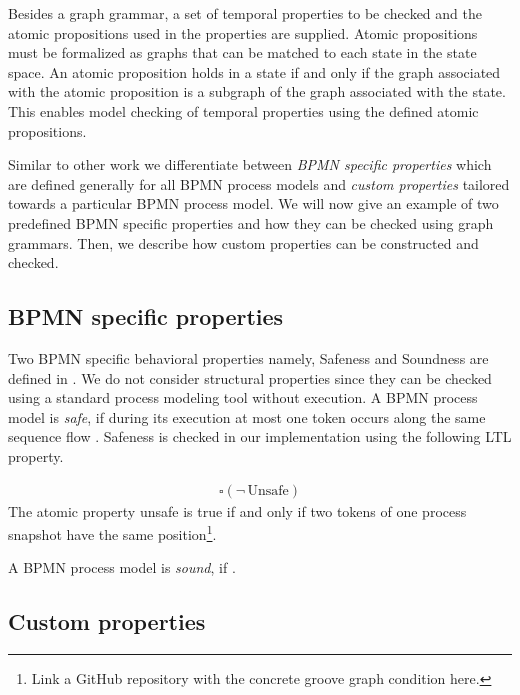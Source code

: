 \documentclass[adraft, copyright, creativecommons]{eptcs} %
\begin{document}
Besides a graph grammar, a set of temporal properties to be checked and the atomic propositions used in the properties are supplied.
Atomic propositions must be formalized as graphs that can be matched to each state in the state space.
An atomic proposition holds in a state if and only if the graph associated with the atomic proposition is a subgraph of the graph associated with the state. %
This enables model checking of temporal properties using the defined atomic propositions.

Similar to other work we differentiate between \emph{BPMN specific properties} which are defined generally for all BPMN process models and \emph{custom properties} tailored towards a particular BPMN process model.
We will now give an example of two predefined BPMN specific properties and how they can be checked using graph grammars.
Then, we describe how custom properties can be constructed and checked.

\subsection{BPMN specific properties}
Two BPMN specific behavioral properties namely, Safeness and Soundness are defined in \cite{corradiniClassificationBPMNCollaborations2018}.
We do not consider structural properties since they can be checked using a standard process modeling tool without execution.
A BPMN process model is \emph{safe}, if during its execution at most one token occurs along the same sequence flow \cite{corradiniClassificationBPMNCollaborations2018}.
Safeness is checked in our implementation using the following LTL property.

\begin{align}
    \square (\neg \,\text{Unsafe}) \label{eq:safeness}
\end{align}
The atomic property unsafe is true if and only if two tokens of one process snapshot have the same position\footnote{Link a GitHub repository with the concrete groove graph condition here.}.

A BPMN process model is \emph{sound}, if \cite{corradiniClassificationBPMNCollaborations2018}.


\subsection{Custom properties}
\end{document}
